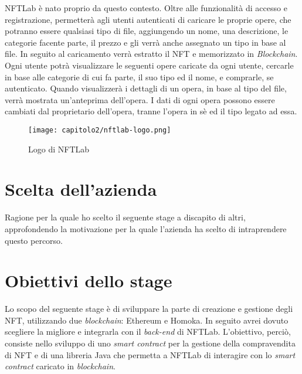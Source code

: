 NFTLab è nato proprio da questo contesto. Oltre alle funzionalità di accesso e registrazione, permetterà agli utenti autenticati di caricare le proprie opere, che potranno essere qualsiasi tipo di file, aggiungendo un nome, una descrizione, le categorie facente parte, il prezzo e gli verrà anche assegnato un tipo in base al file. In seguito al caricamento verrà estratto il NFT e memorizzato in \emph{Blockchain}. 
Ogni utente potrà visualizzare le seguenti opere caricate da ogni utente, cercarle in base alle categorie di cui fa parte, il suo tipo ed il nome, e comprarle, se autenticato. Quando visualizzerà i dettagli di un opera, in base al tipo del file, verrà mostrata un'anteprima dell'opera.
I dati di ogni opera possono essere cambiati dal proprietario dell'opera, tranne l'opera in sè ed il tipo legato ad essa.

\begin{figure}[!h]
  \centering
  \texttt{[image: capitolo2/nftlab-logo.png]}
  \caption{Logo di NFTLab}
\end{figure}


\section{Scelta dell'azienda}
Ragione per la quale ho scelto il seguente stage a discapito di altri, approfondendo la motivazione per la quale l'azienda ha scelto di intraprendere questo percorso.


\section{Obiettivi dello stage}
Lo scopo del seguente stage è di sviluppare la parte di creazione e gestione degli NFT, utilizzando due \emph{blockchain}: Ethereum e Homoka. In seguito avrei dovuto scegliere la migliore e integrarla con il \emph{back-end} di NFTLab. L'obiettivo, perciò, consiste nello sviluppo di uno \emph{smart contract} per la gestione della compravendita di NFT e di una libreria Java che permetta a NFTLab di interagire con lo \emph{smart contract} caricato in \emph{blockchain}. \\

